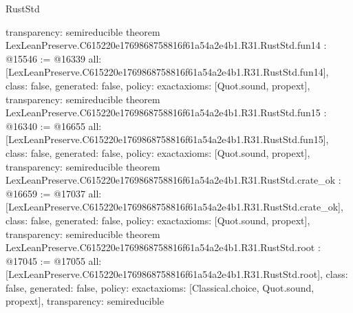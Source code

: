 \begin{lexlean}{RustStd}
\begin{coremodule}
{  transparency: semireducible
}
theorem LexLeanPreserve.C615220e1769868758816f61a54a2e4b1.R31.RustStd.fun14 : @15546 := @16339 {
  all: [LexLeanPreserve.C615220e1769868758816f61a54a2e4b1.R31.RustStd.fun14],
  class: false,
  generated: false,
  policy: exact{axioms: [Quot.sound, propext]},
  transparency: semireducible
}
theorem LexLeanPreserve.C615220e1769868758816f61a54a2e4b1.R31.RustStd.fun15 : @16340 := @16655 {
  all: [LexLeanPreserve.C615220e1769868758816f61a54a2e4b1.R31.RustStd.fun15],
  class: false,
  generated: false,
  policy: exact{axioms: [Quot.sound, propext]},
  transparency: semireducible
}
theorem LexLeanPreserve.C615220e1769868758816f61a54a2e4b1.R31.RustStd.crate_ok : @16659 := @17037 {
  all: [LexLeanPreserve.C615220e1769868758816f61a54a2e4b1.R31.RustStd.crate_ok],
  class: false,
  generated: false,
  policy: exact{axioms: [Quot.sound, propext]},
  transparency: semireducible
}
theorem LexLeanPreserve.C615220e1769868758816f61a54a2e4b1.R31.RustStd.root : @17045 := @17055 {
  all: [LexLeanPreserve.C615220e1769868758816f61a54a2e4b1.R31.RustStd.root],
  class: false,
  generated: false,
  policy: exact{axioms: [Classical.choice, Quot.sound, propext]},
  transparency: semireducible
}


\end{coremodule}
\end{lexlean}
